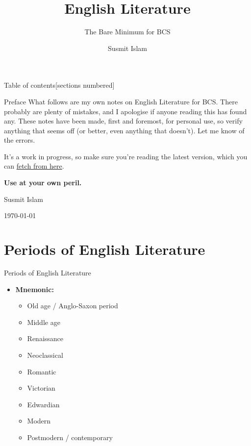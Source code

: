 \documentclass[
  12pt,
    progressbar=frametitle]{beamer}
\title{English Literature}
\subtitle{The Bare Minimum for BCS}
\author{Susmit Islam}
\date{}
\institute{Sir Salimullah Medical College}
\providecommand{\tightlist}{%
  \setlength{\itemsep}{0pt}\setlength{\parskip}{0pt}}
\begin{document}
\frame{\titlepage}
\begin{frame}[t,allowframebreaks]
{Table of contents}[sections numbered]

\tableofcontents[hideallsubsections]
\end{frame}


\begin{frame}[allowframebreaks]
{Preface}
What follows are my own notes on English Literature for BCS. There
probably are plenty of mistakes, and I apologise if anyone reading this
has found any. These notes have been made, first and foremost, for
personal use, so verify anything that seems off (or better, even
anything that doesn't). Let me know of the errors.

It's a work in progress, so make sure you're reading the latest version,
which you can
\href{https://github.com/susmit31/bcs-notes/raw/master/pdfs/lit.pdf}
 {fetch from here}.

\textbf{Use at your own peril.}

\hfill Susmit Islam

\hfill \today
\end{frame}

\section{Periods of English Literature}
\begin{frame}[allowframebreaks]
{Periods of English Literature}
\begin{itemize}
\tightlist
\item
  \textbf{Mnemonic:}
  \footnotesize{}\;\normalsize

  \begin{itemize}
  \tightlist
  \item
    Old age / Anglo-Saxon period
  \item
    Middle age
  \item
    Renaissance
  \item
    Neoclassical
  \item
    Romantic
  \item
    Victorian
  \item
    Edwardian
  \item
    Modern
  \item
    Postmodern / contemporary
  \end{itemize}
\end{itemize}
\end{frame}
\end{document}
